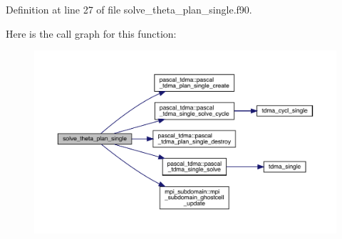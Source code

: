 Definition at line 27 of file solve\+\_\+theta\+\_\+plan\+\_\+single.\+f90.

Here is the call graph for this function\+:
\nopagebreak
\begin{figure}[H]
\begin{center}
\leavevmode
\includegraphics[width=350pt]{solve__theta__plan__single_8f90_a53ef6756822306f33a47be6a66232862_cgraph}
\end{center}
\end{figure}
